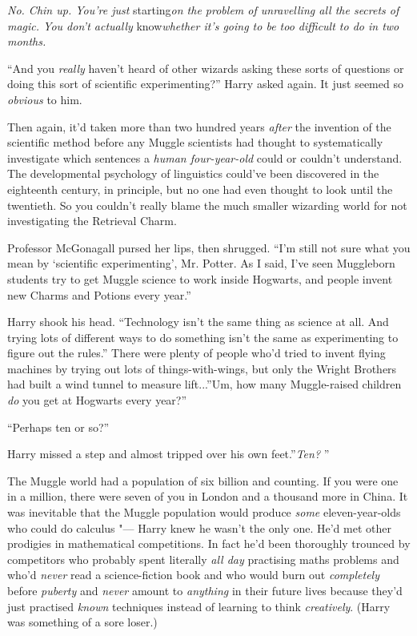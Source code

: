 \emph{No. Chin up. You're just} starting\emph{on the problem of
unravelling all the secrets of magic. You don't actually}
know\emph{whether it's going to be too difficult to do in two months.}

``And you \emph{really} haven't heard of other wizards asking these sorts
of questions or doing this sort of scientific experimenting?'' Harry
asked again. It just seemed so \emph{obvious} to him.

Then again, it'd taken more than two hundred years \emph{after} the
invention of the scientific method before any Muggle scientists had
thought to systematically investigate which sentences a \emph{human
four-year-old} could or couldn't understand. The developmental
psychology of linguistics could've been discovered in the eighteenth
century, in principle, but no one had even thought to look until the
twentieth. So you couldn't really blame the much smaller wizarding world
for not investigating the Retrieval Charm.

Professor McGonagall pursed her lips, then shrugged. ``I'm still not
sure what you mean by `scientific experimenting', Mr. Potter. As I said,
I've seen Muggleborn students try to get Muggle science to work inside
Hogwarts, and people invent new Charms and Potions every year.''

Harry shook his head. ``Technology isn't the same thing as science at
all. And trying lots of different ways to do something isn't the same as
experimenting to figure out the rules.'' There were plenty of people
who'd tried to invent flying machines by trying out lots of
things-with-wings, but only the Wright Brothers had built a wind tunnel
to measure lift...''Um, how many Muggle-raised children \emph{do}
you get at Hogwarts every year?''

``Perhaps ten or so?''

Harry missed a step and almost tripped over his own feet.''\emph{Ten?} ''

The Muggle world had a population of six billion and counting. If you
were one in a million, there were seven of you in London and a thousand
more in China. It was inevitable that the Muggle population would
produce \emph{some} eleven-year-olds who could do calculus "--- Harry knew
he wasn't the only one. He'd met other prodigies in mathematical
competitions. In fact he'd been thoroughly trounced by competitors who
probably spent literally \emph{all day} practising maths problems and
who'd \emph{never} read a science-fiction book and who would burn out
\emph{completely} before \emph{puberty} and \emph{never} amount to
\emph{anything} in their future lives because they'd just practised
\emph{known} techniques instead of learning to think \emph{creatively}.
(Harry was something of a sore loser.)

